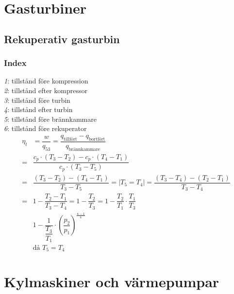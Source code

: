 \section*{Gasturbiner}
\subsection*{Rekuperativ gasturbin}
\subsubsection*{Index}
	\textit{1}: tillstånd före kompression\\ 
	\textit{2}: tillstånd efter kompressor\\ 
	\textit{3}: tillstånd före turbin\\ 
	\textit{4}: tillstånd efter turbin\\ 
	\textit{5}: tillstånd före brännkammare\\ 
	\textit{6}: tillstånd före rekuperator
	\begin{align*}
		\eta_t & = \dfrac{w}{q_{53}} = \dfrac{q_{\text{tillfört}} - q_{\text{bortfört}}}{q_{\text{brännkammare}}} \\
		= &  \dfrac{c_p \cdot (T_3 - T_2) - c_p \cdot (T_4 - T_1)}{c_p \cdot (T_3 - T_5)} \\
		= &  \dfrac{(T_3 - T_2) - (T_4 - T_1)}{T_3 - T_5} = \bigg| T_5 = T_4 \bigg| = \dfrac{(T_3 - T_4) - (T_2 - T_1)}{T_3 - T_4} \\
		= & 1- \dfrac{T_2 - T_1}{T_3 - T_4} = 1 - \dfrac{T_2}{T_3} = 1 - \dfrac{T_2}{T_1} \cdot \dfrac{T_1}{T_3}\\ 
			& 1 - \dfrac{1}{\dfrac{T_3}{T_1}} \cdot \left(\dfrac{p_2}{p_1}\right)^\frac{\kappa -1}{\kappa} \\
			& \text{då } T_5 = T_4
	\end{align*}
\section*{Kylmaskiner och värmepumpar}
